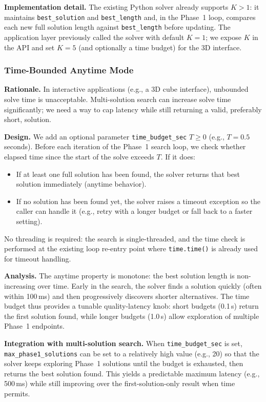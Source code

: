 \documentclass[10pt,twocolumn,a4paper]{article}
\begin{document}
\textbf{Implementation detail.} The existing Python solver already supports $K>1$: it maintains \texttt{best\_solution} and \texttt{best\_length} and, in the Phase~1 loop, compares each new full solution length against \texttt{best\_length} before updating. The application layer previously called the solver with default $K=1$; we expose $K$ in the API and set $K=5$ (and optionally a time budget) for the 3D interface.

\subsubsection{Time-Bounded Anytime Mode}
\label{sec:anytime}

\textbf{Rationale.} In interactive applications (e.g., a 3D cube interface), unbounded solve time is unacceptable. Multi-solution search can increase solve time significantly; we need a way to cap latency while still returning a valid, preferably short, solution.

\textbf{Design.} We add an optional parameter \texttt{time\_budget\_sec} $T \geq 0$ (e.g., $T = 0.5$ seconds). Before each iteration of the Phase~1 search loop, we check whether elapsed time since the start of the solve exceeds $T$. If it does:
\begin{itemize}
  \item If at least one full solution has been found, the solver returns that best solution immediately (anytime behavior).
  \item If no solution has been found yet, the solver raises a timeout exception so the caller can handle it (e.g., retry with a longer budget or fall back to a faster setting).
\end{itemize}
No threading is required: the search is single-threaded, and the time check is performed at the existing loop re-entry point where \texttt{time.time()} is already used for timeout handling.

\textbf{Analysis.} The anytime property is monotone: the best solution length is non-increasing over time. Early in the search, the solver finds a solution quickly (often within 100\,ms) and then progressively discovers shorter alternatives. The time budget thus provides a tunable quality-latency knob: short budgets (0.1\,s) return the first solution found, while longer budgets (1.0\,s) allow exploration of multiple Phase~1 endpoints.

\textbf{Integration with multi-solution search.} When \texttt{time\_budget\_sec} is set, \texttt{max\_phase1\_solutions} can be set to a relatively high value (e.g., 20) so that the solver keeps exploring Phase~1 solutions until the budget is exhausted, then returns the best solution found. This yields a predictable maximum latency (e.g., 500\,ms) while still improving over the first-solution-only result when time permits.
\end{document}
